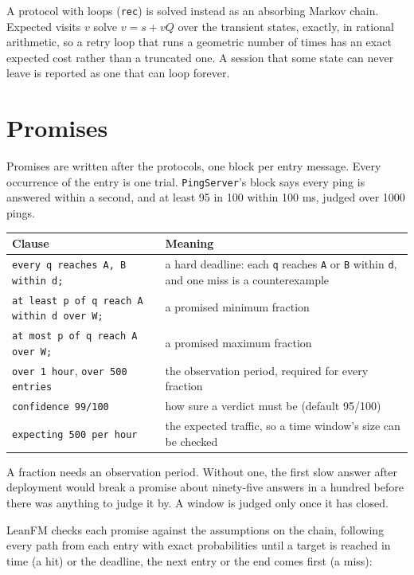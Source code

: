 A protocol with loops (\texttt{rec}) is solved instead as an absorbing Markov
chain. Expected visits $v$ solve $v = s + vQ$ over the transient states, exactly,
in rational arithmetic, so a retry loop that runs a geometric number of times
has an exact expected cost rather than a truncated one. A session that some state
can never leave is reported as one that can loop forever.

\section{Promises}

Promises are written after the protocols, one block per entry message. Every
occurrence of the entry is one trial. \texttt{PingServer}'s block says every ping is
answered within a second, and at least 95 in 100 within 100 ms, judged over 1000
pings.

\begin{center}
\small
\begin{tabular}{@{}p{}p{}@{}}
\toprule
Clause & Meaning \\
\midrule
\texttt{every q reaches A, B within d;} & a hard deadline: each \texttt{q} reaches \texttt{A} or \texttt{B} within \texttt{d}, and one miss is a counterexample \\
\texttt{at least p of q reach A within d over W;} & a promised minimum fraction \\
\texttt{at most p of q reach A over W;} & a promised maximum fraction \\
\texttt{over 1 hour}, \texttt{over 500 entries} & the observation period, required for every fraction \\
\texttt{confidence 99/100} & how sure a verdict must be (default 95/100) \\
\texttt{expecting 500 per hour} & the expected traffic, so a time window's size can be checked \\
\bottomrule
\end{tabular}
\end{center}

A fraction needs an observation period. Without one, the first slow answer after
deployment would break a promise about ninety-five answers in a hundred before
there was anything to judge it by. A window is judged only once it has closed.

LeanFM checks each promise against the assumptions on the chain, following every
path from each entry with exact probabilities until a target is reached in time
(a hit) or the deadline, the next entry or the end comes first (a miss):

